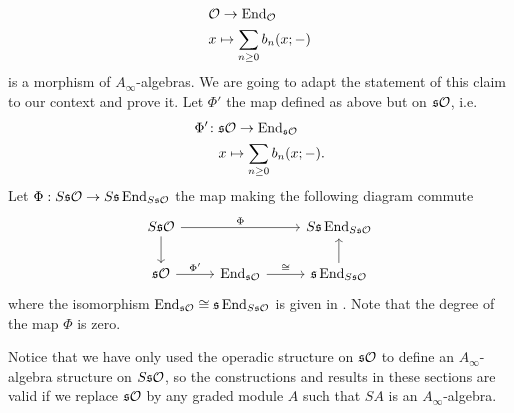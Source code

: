 \documentclass[join.tex]{subfiles}
\begin{document}
\begin{align*}
&{\mathcal O} \to \operatorname{End}_{\mathcal O}\\
&x\mapsto \sum_{n\geq 0}b_n(x;-)
\end{align*}
is a morphism of $A_\infty$-algebras. We are going to adapt the statement of this claim to our context and prove it. Let $\Phi'$ the map defined as above but on $\mathfrak{s}{\mathcal O}$, i.e.
\begin{align*}
\Phi'\colon&\mathfrak{s}{\mathcal O} \to \operatorname{End}_{\mathfrak{s}{\mathcal O}}\\
&x\mapsto \sum_{n\geq 0}b_n(x;-).
\end{align*}
Let $\Phi:S\mathfrak{s}{\mathcal O}\to S\mathfrak{s}\operatorname{End}_{S\mathfrak{s}{\mathcal O}}$ the map making the following diagram commute
\[
\begin{tikzcd}
S\s\OO\arrow[rr, "\Phi"]\arrow[d] & & S\s\End_{S\s\OO}\\
\s\OO\arrow[r, "\Phi'"]& \End_{\s\OO}\arrow[r, "\cong"]& \s\End_{S\s\OO}\arrow[u]
\end{tikzcd}
\]
where the isomorphism $\operatorname{End}_{\mathfrak{s}{\mathcal O}}\cong\mathfrak{s}\operatorname{End}_{S\mathfrak{s}{\mathcal O}}$ is given in . Note that the degree of the map $\Phi$ is zero.

\begin{remark}
Notice that we have only used the operadic structure on $\mathfrak{s}{\mathcal O}$ to define an $A_\infty$-algebra structure on $S\mathfrak{s}{\mathcal O}$, so the constructions and results in these sections are valid if we replace $\mathfrak{s}{\mathcal O}$ by any graded module $A$ such that $SA$ is an $A_\infty$-algebra. 
\end{remark}
\end{document}
